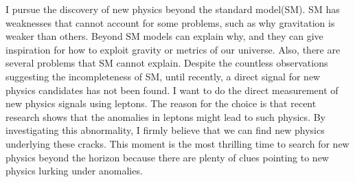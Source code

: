 I pursue the discovery of new physics beyond the standard model(SM). SM has weaknesses that cannot account for some problems, such as why gravitation is weaker than others. Beyond SM models can explain why, and they can give inspiration for how to exploit gravity or metrics of our universe. Also, there are several problems that SM cannot explain. Despite the countless observations suggesting the incompleteness of SM, until recently, a direct signal for new physics candidates has not been found. I want to do the direct measurement of new physics signals using leptons. The reason for the choice is that recent research shows that the anomalies in leptons might lead to such physics. By investigating this abnormality, I firmly believe that we can find new physics underlying these cracks. This moment is the most thrilling time to search for new physics beyond the horizon because there are plenty of clues pointing to new physics lurking under anomalies. 
